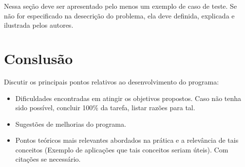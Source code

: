 

Nessa seção deve ser apresentado pelo menos um exemplo de caso de teste. Se não for especificado na desecrição do problema, ela deve definida, explicada e ilustrada pelos autores.

\section{Conslusão}\label{conclusion}

Discutir os principais pontos relativos ao desenvolvimento do programa:

\begin{itemize}
	\item Dificuldades encontradas em atingir os objetivos propostos. Caso não tenha sido possível, concluir 100\% da tarefa, listar razões para tal.
	\item Sugestões de melhorias do programa.
	\item Pontos teóricos mais relevantes abordados na prática e a relevância de tais conceitos (Exemplo de aplicações que tais conceitos seriam úteis). Com citações  se necessário.
\end{itemize}


